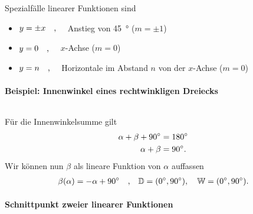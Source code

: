 \clearpage
Spezialfälle linearer Funktionen sind 
\begin{itemize}
    \item $y = \pm x \qq{,}$ Anstieg von \SI{45}{\degree} ($m = \pm 1$)
    \item $y = 0 \qq{,}$ $x$-Achse ($m = 0$)
    \item $y = n \qq{,}$ Horizontale im Abstand $n$ von der $x$-Achse ($m = 0$)
\end{itemize}

\paragraph{Beispiel: Innenwinkel eines rechtwinkligen Dreiecks}$~$

Für die Innenwinkelsumme gilt 
\begin{align}
    \alpha + \beta + \SI{90}{\degree} &= \SI{180}{\degree} \notag \\
    \alpha + \beta &= \SI{90}{\degree}.
\end{align}
Wir können nun $\beta$ als lineare Funktion von $\alpha$ auffassen 
\begin{align}
    \beta(\alpha) = -\alpha + \SI{90}{\degree} \qq{,} \mathbb{D} = (\SI{0}{\degree},\SI{90}{\degree}),\quad  \mathbb{W} = (\SI{0}{\degree},\SI{90}{\degree}).
\end{align}

\paragraph{Schnittpunkt zweier linearer Funktionen}$~$

